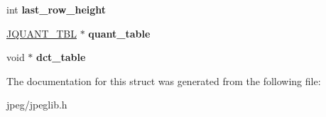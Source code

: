 \begin{DoxyCompactItemize}
\item 
int {\bfseries last\+\_\+row\+\_\+height}\hypertarget{structjpeg__component__info_a7d0738ae3647a019722410a2d718f3d3}{}\label{structjpeg__component__info_a7d0738ae3647a019722410a2d718f3d3}

\item 
\hyperlink{struct_j_q_u_a_n_t___t_b_l}{J\+Q\+U\+A\+N\+T\+\_\+\+T\+BL} $\ast$ {\bfseries quant\+\_\+table}\hypertarget{structjpeg__component__info_afd551e8e9dbc3f3076c10cd4d391fdac}{}\label{structjpeg__component__info_afd551e8e9dbc3f3076c10cd4d391fdac}

\item 
void $\ast$ {\bfseries dct\+\_\+table}\hypertarget{structjpeg__component__info_a9f68a39fc17561866668c1b9d4a8f238}{}\label{structjpeg__component__info_a9f68a39fc17561866668c1b9d4a8f238}

\end{DoxyCompactItemize}


The documentation for this struct was generated from the following file\+:\begin{DoxyCompactItemize}
\item 
jpeg/jpeglib.\+h\end{DoxyCompactItemize}
